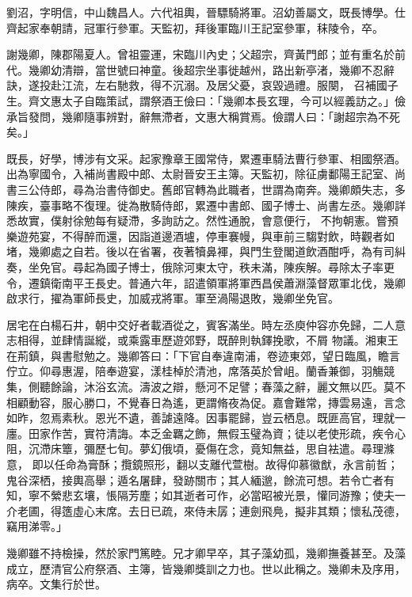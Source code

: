 \begin{pinyinscope}
 劉沼，字明信，中山魏昌人。六代祖輿，晉驃騎將軍。沼幼善屬文，既長博學。仕齊起家奉朝請，冠軍行參軍。天監初，拜後軍臨川王記室參軍，秣陵令，卒。



 謝幾卿，陳郡陽夏人。曾祖靈運，宋臨川內史；父超宗，齊黃門郎；並有重名於前代。幾卿幼清辯，當世號曰神童。後超宗坐事徙越州，路出新亭渚，幾卿不忍辭訣，遂投赴江流，左右馳救，得不沉溺。及居父憂，哀毀過禮。服闋，
 召補國子生。齊文惠太子自臨策試，謂祭酒王儉曰：「幾卿本長玄理，今可以經義訪之。」儉承旨發問，幾卿隨事辨對，辭無滯者，文惠大稱賞焉。儉謂人曰：「謝超宗為不死矣。」



 既長，好學，博涉有文采。起家豫章王國常侍，累遷車騎法曹行參軍、相國祭酒。出為寧國令，入補尚書殿中郎、太尉晉安王主簿。天監初，除征虜鄱陽王記室、尚書三公侍郎，尋為治書侍御史。舊郎官轉為此職者，世謂為南奔。幾卿頗失志，多陳疾，臺事略不復理。徙為散騎侍郎，累遷中書郎、國子博士、尚書左丞。幾卿詳悉故實，僕射徐勉每有疑滯，多詢訪之。然性通脫，會意便行，
 不拘朝憲。嘗預樂遊苑宴，不得醉而還，因詣道邊酒壚，停車褰幔，與車前三騶對飲，時觀者如堵，幾卿處之自若。後以在省署，夜著犢鼻褌，與門生登閣道飲酒酣呼，為有司糾奏，坐免官。尋起為國子博士，俄除河東太守，秩未滿，陳疾解。尋除太子率更令，遷鎮衛南平王長史。普通六年，詔遣領軍將軍西昌侯蕭淵藻督眾軍北伐，幾卿啟求行，擢為軍師長史，加威戎將軍。軍至渦陽退敗，幾卿坐免官。



 居宅在白楊石井，朝中交好者載酒從之，賓客滿坐。時左丞庾仲容亦免歸，二人意志相得，並肆情誕縱，或乘露車歷遊郊野，既醉則執鐸挽歌，不屑
 物議。湘東王在荊鎮，與書慰勉之。幾卿答曰：「下官自奉違南浦，卷迹東郊，望日臨風，瞻言佇立。仰尋惠渥，陪奉遊宴，漾桂棹於清池，席落英於曾岨。蘭香兼御，羽觴競集，側聽餘論，沐浴玄流。濤波之辯，懸河不足譬；春藻之辭，麗文無以匹。莫不相顧動容，服心勝口，不覺春日為遙，更謂脩夜為促。嘉會難常，摶雲易遠，言念如昨，忽焉素秋。恩光不遺，善謔遠降。因事罷歸，豈云栖息。既匪高官，理就一廛。田家作苦，實符清誨。本乏金羈之飾，無假玉璧為資；徒以老使形疏，疾令心阻，沉滯床簟，彌歷七旬。夢幻俄頃，憂傷在念，竟知無益，思自袪遣。尋理滌意，
 即以任命為膏酥；攬鏡照形，翻以支離代萱樹。故得仰慕徽猷，永言前哲；鬼谷深栖，接輿高舉；遁名屠肆，發跡關市；其人緬邈，餘流可想。若令亡者有知，寧不縈悲玄壤，悵隔芳塵；如其逝者可作，必當昭被光景，懽同游豫；使夫一介老圃，得簉虛心末席。去日已疏，來侍未孱；連劍飛鳧，擬非其類；懷私茂德，竊用涕零。」



 幾卿雖不持檢操，然於家門篤睦。兄才卿早卒，其子藻幼孤，幾卿撫養甚至。及藻成立，歷清官公府祭酒、主簿，皆幾卿獎訓之力也。世以此稱之。幾卿未及序用，病卒。文集行於世。




\end{pinyinscope}
